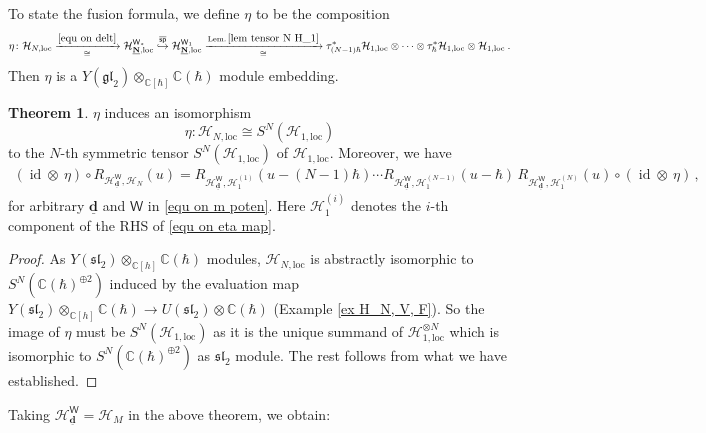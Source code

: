 \documentclass[10pt]{amsart}
\theoremstyle{definition}
\newtheorem{Theorem}{Theorem}[section]
\numberwithin{equation}{section}
\newcommand{\bC}{\mathbb{C}}
\newcommand{\bd}{\mathbf{d}}
\newcommand{\cH}{\mathcal{H}}
\newcommand{\loc}{\mathrm{loc}}
\newcommand{\sW}{\mathsf{W}}
\newcommand{\id}{\operatorname{id}}
\begin{document}
To state the fusion formula, we define $\eta$ to be the composition 
\begin{align}\label{equ on eta map}
    \eta\colon \cH_{N,\loc}\xrightarrow[\cong]{\eqref{equ on delt}} \cH^{\sW_*}_{\underline{\mathbf N},\loc}\overset{\overline{\mathsf{sp}}}{\hookrightarrow}\cH^{\sW_1}_{\underline{\mathbf N},\loc}\xrightarrow[\cong]{\text{Lem.\,}\ref{lem tensor N H_1}} \tau^*_{(N-1)\hbar}\cH_{1,\loc}\otimes \cdots \otimes \tau^*_{\hbar}\cH_{1,\loc}\otimes \cH_{1,\loc}\:.
\end{align}
Then $\eta$ is a $Y(\mathfrak{gl}_2)\otimes_{\bC[\hbar]}\bC(\hbar)$ module embedding.

\begin{Theorem}\label{thm fusion}
$\eta$ induces an isomorphism 
$$\eta\colon \cH_{N,\loc}\cong S^N(\cH_{1,\loc})$$
to the $N$-th symmetric tensor $S^N(\cH_{1,\loc})$ of $\cH_{1,\loc}$. Moreover, we have
\begin{align*}
    (\id\otimes \:\eta)\circ R_{\mathcal H^{\sW}_{\underline{\bd}},\cH_N}(u)= R_{\mathcal H^{\sW}_{\underline{\bd}},\mathcal H_1^{(1)}}(u-(N-1)\hbar)\cdots R_{\mathcal H^{\sW}_{\underline{\bd}},\mathcal H_1^{(N-1)}}(u-\hbar)\,R_{\mathcal H^{\sW}_{\underline{\bd}},\mathcal H_1^{(N)}}(u)\circ (\id\otimes \:\eta)\,,
\end{align*}
for arbitrary $\underline{\bd}$ and $\sW$ in \eqref{equ on m poten}. 
Here $\mathcal H_1^{(i)}$ denotes the $i$-th component of the RHS of \eqref{equ on eta map}.
\end{Theorem}

\begin{proof}
As $Y(\mathfrak{sl}_2)\otimes_{\bC[h]}\bC(\hbar)$ modules, $\cH_{N,\loc}$ is abstractly isomorphic to $S^N(\bC(\hbar)^{\oplus 2})$ induced by the evaluation map $Y(\mathfrak{sl}_2)\otimes_{\bC[h]}\bC(\hbar)\to U(\mathfrak{sl}_2)\otimes\bC(\hbar)$ (Example \ref{ex H_N, V, F}). So the image of $\eta$ must be $S^N(\cH_{1,\loc})$ as it is the unique summand of $\cH_{1,\loc}^{\otimes N}$ which is isomorphic to $S^N(\bC(\hbar)^{\oplus 2})$ as $\mathfrak{sl}_2$ module. The rest follows from what we have established.
\end{proof}

Taking $\mathcal H^{\sW}_{\underline{\bd}}=\cH_M$ in the above theorem, we obtain:
\end{document}

